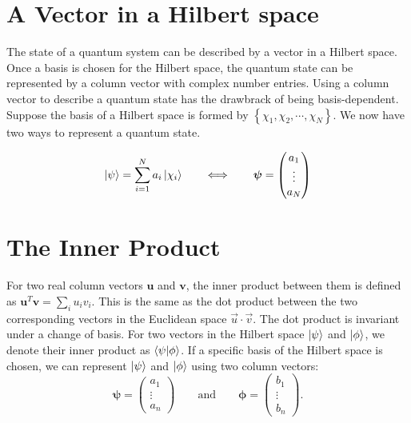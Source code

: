 \documentclass[class=report,crop=false]{standalone}
\begin{document}
\section*{A Vector in a Hilbert space}
\addtocounter{section}{1}
\setcounter{equation}{0}

The state of a quantum system can be described by a vector in a Hilbert space. Once a basis is chosen for the Hilbert space, the quantum state can be represented by a column vector with complex number entries. Using a column vector to describe a quantum state has the drawbrack of being basis-dependent. Suppose the basis of a Hilbert space is formed by $\displaystyle \left\{ \chi_1, \chi_2, \cdots, \chi_N \right\}$. We now have two ways to represent a quantum state.

\begin{equation}
    \ket{\psi} = \sum\limits_{i = 1}^{N} a_i \ket{\chi_i} \qquad \Longleftrightarrow \qquad \bm{\psi} = \begin{pmatrix} a_1 \\ \vdots \\ a_N \end{pmatrix}
\end{equation}

\section*{The Inner Product}
\addtocounter{section}{1}
\setcounter{equation}{0}

For two real column vectors $\bm{u}$ and $\bm{v}$, the inner product between them is defined as $\displaystyle \bm{u}^T \bm{v} = \sum_i u_i v_i$. This is the same as the dot product between the two corresponding vectors in the Euclidean space $\vec{u} \cdot \vec{v}$. The dot product is invariant under a change of basis. For two vectors in the Hilbert space $\ket{\psi}$ and $\ket{\phi}$, we denote their inner product as $\braket{\psi | \phi}$. If a specific basis of the Hilbert space is chosen, we can represent $\ket{\psi}$ and $\ket{\phi}$ using two column vectors:
\begin{equation}
    \bm{\psi} = \begin{pmatrix} a_1 \\ \vdots \\ a_n \end{pmatrix} \qquad \text{and} \qquad \bm{\phi} = \begin{pmatrix} b_1 \\ \vdots \\ b_n \end{pmatrix}.
\end{equation}
\end{document}
